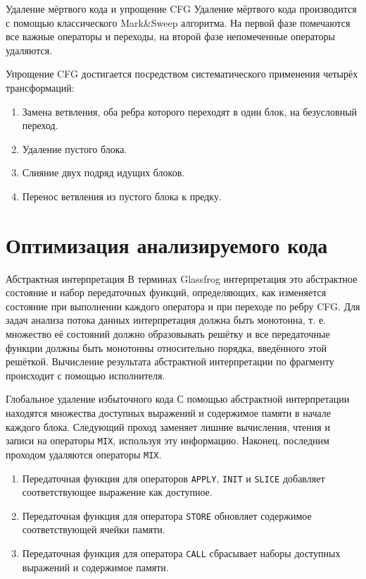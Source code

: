 \documentclass[presentation]{beamer}
\begin{document}
\begin{frame}[label={sec:org52d79bb}]{Удаление мёртвого кода и упрощение CFG}
Удаление мёртвого кода производится с помощью классического Mark\&Sweep алгоритма. На первой фазе помечаются все важные операторы и переходы, на второй фазе непомеченные операторы удаляются.

Упрощение CFG достигается посредством систематического применения четырёх трансформаций:
\begin{enumerate}
\item Замена ветвления, оба ребра которого переходят в один блок, на безусловный переход.
\item Удаление пустого блока.
\item Слияние двух подряд идущих блоков.
\item Перенос ветвления из пустого блока к предку.
\end{enumerate}
\end{frame}
\section{Оптимизация анализируемого кода}
\label{sec:orgdcdf513}
\begin{frame}[label={sec:org77113a4}]{Абстрактная интерпретация}
В терминах Glassfrog интерпретация это абстрактное состояние и набор передаточных функций, определяющих, как изменяется состояние при выполнении каждого оператора и при переходе по ребру CFG. Для задач анализа потока данных интерпретация должна быть монотонна, т. е. множество её состояний должно образовывать решётку и все передаточные функции должны быть монотонны относительно порядка, введённого этой решёткой. Вычисление результата абстрактной интерпретации по фрагменту происходит с помощью исполнителя.
\end{frame}
\begin{frame}[label={sec:org08d9138},fragile]{Глобальное удаление избыточного кода}
 С помощью абстрактной интерпретации находятся множества доступных выражений и содержимое памяти в начале каждого блока. Следующий проход заменяет лишние вычисления, чтения и записи на операторы \texttt{MIX}, используя эту информацию. Наконец, последним проходом удаляются операторы \texttt{MIX}.
\begin{enumerate}
\item Передаточная функция для операторов \texttt{APPLY}, \texttt{INIT} и \texttt{SLICE} добавляет соответствующее выражение как доступное.
\item Передаточная функция для оператора \texttt{STORE} обновляет содержимое соответствующей ячейки памяти.
\item Передаточная функция для оператора \texttt{CALL} сбрасывает наборы доступных выражений и содержимое памяти.
\end{enumerate}
\end{frame}
\end{document}
